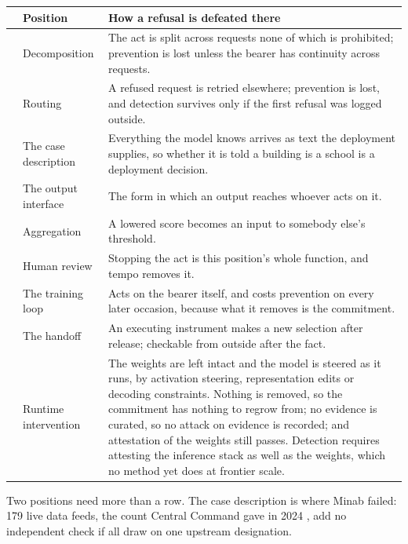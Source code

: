 \begingroup\small\renewcommand{\arraystretch}{1.12}
\begin{longtable}{@{}>{\raggedright\arraybackslash}p{}>{\raggedright\arraybackslash}p{}>{\raggedright\arraybackslash}p{}@{}}
\hline
 & \textbf{Position} & \textbf{How a refusal is defeated there} \\
\hline
\endhead
1 & Decomposition & The act is split across requests none of which is prohibited; prevention is lost unless the bearer has continuity across requests. \\ \hline
2 & Routing & A refused request is retried elsewhere; prevention is lost, and detection survives only if the first refusal was logged outside. \\ \hline
3 & The case description & Everything the model knows arrives as text the deployment supplies, so whether it is told a building is a school is a deployment decision. \\ \hline
4 & The output interface & The form in which an output reaches whoever acts on it. \\ \hline
5 & Aggregation & A lowered score becomes an input to somebody else's threshold. \\ \hline
6 & Human review & Stopping the act is this position's whole function, and tempo removes it. \\ \hline
7 & The training loop & Acts on the bearer itself, and costs prevention on every later occasion, because what it removes is the commitment. \\ \hline
8 & The handoff & An executing instrument makes a new selection after release; checkable from outside after the fact. \\ \hline
9 & Runtime intervention & The weights are left intact and the model is steered as it runs, by activation steering, representation edits or decoding constraints. Nothing is removed, so the commitment has nothing to regrow from; no evidence is curated, so no attack on evidence is recorded; and attestation of the weights still passes. Detection requires attesting the inference stack as well as the weights, which no method yet does at frontier scale. \\ \hline
\end{longtable}
\endgroup

Two positions need more than a row. The case description is where Minab failed: 179 live data feeds, the count Central Command gave in 2024 \autocite{freedberg2024maven}, add no independent check if all draw on one upstream designation.

